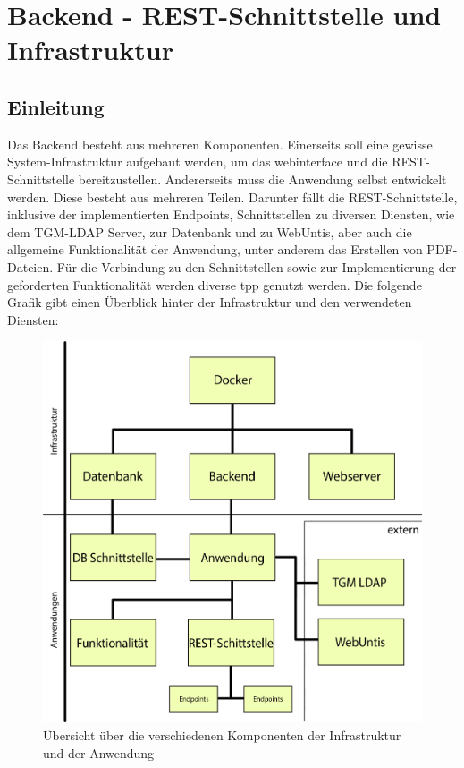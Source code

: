 
\section{Backend - REST-Schnittstelle und Infrastruktur}
\label{chap:backendsota}
	\subsection{Einleitung}
	Das Backend besteht aus mehreren Komponenten. Einerseits soll eine gewisse System-Infrastruktur aufgebaut werden, um das \gls{webinterface} und die REST-Schnittstelle bereitzustellen. Andererseits muss die Anwendung selbst entwickelt werden. Diese besteht aus mehreren Teilen. Darunter fällt die REST-Schnittstelle, inklusive der implementierten Endpoints, Schnittstellen zu diversen Diensten, wie dem TGM-LDAP Server, zur Datenbank und zu WebUntis, aber auch die allgemeine Funktionalität der Anwendung, unter anderem das Erstellen von PDF-Dateien. Für die Verbindung zu den Schnittstellen sowie zur Implementierung der geforderten Funktionalität werden diverse  \gls{tpp} genutzt werden. Die folgende Grafik gibt einen Überblick hinter der Infrastruktur und den verwendeten Diensten:
	\begin{figure}[H]
		\centering
		\includegraphics[width=0.8\linewidth]{images/uebersicht}
		\caption[Übersicht über die Komponenten]{Übersicht über die verschiedenen Komponenten der Infrastruktur und der Anwendung}
		\label{fig:uebersicht}
	\end{figure}
	
